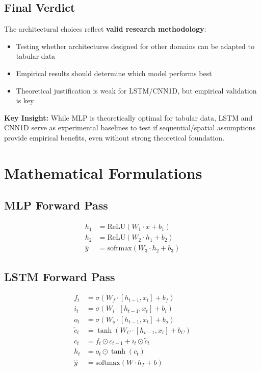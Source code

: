 \documentclass[12pt]{article}
\begin{document}
\subsection{Final Verdict}

The architectural choices reflect \textbf{valid research methodology}:
\begin{itemize}
    \item Testing whether architectures designed for other domains can be adapted to tabular data
    \item Empirical results should determine which model performs best
    \item Theoretical justification is weak for LSTM/CNN1D, but empirical validation is key
\end{itemize}

\textbf{Key Insight:} While MLP is theoretically optimal for tabular data, LSTM and CNN1D serve as experimental baselines to test if sequential/spatial assumptions provide empirical benefits, even without strong theoretical foundation.

\section{Mathematical Formulations}

\subsection{MLP Forward Pass}

\[
\begin{aligned}
h_1 &= \text{ReLU}(W_1 \cdot x + b_1) \\
h_2 &= \text{ReLU}(W_2 \cdot h_1 + b_2) \\
\hat{y} &= \text{softmax}(W_3 \cdot h_2 + b_3)
\end{aligned}
\]

\subsection{LSTM Forward Pass}

\[
\begin{aligned}
f_t &= \sigma(W_f \cdot [h_{t-1}, x_t] + b_f) \\
i_t &= \sigma(W_i \cdot [h_{t-1}, x_t] + b_i) \\
o_t &= \sigma(W_o \cdot [h_{t-1}, x_t] + b_o) \\
\tilde{c}_t &= \tanh(W_C \cdot [h_{t-1}, x_t] + b_C) \\
c_t &= f_t \odot c_{t-1} + i_t \odot \tilde{c}_t \\
h_t &= o_t \odot \tanh(c_t) \\
\hat{y} &= \text{softmax}(W \cdot h_T + b)
\end{aligned}
\]
\end{document}
